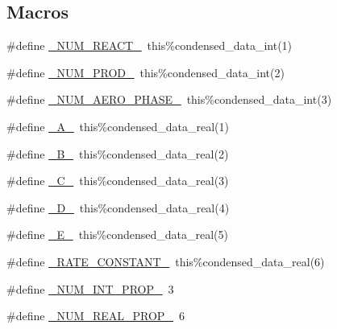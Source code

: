 \subsection*{Macros}
\begin{DoxyCompactItemize}
\item 
\#define \mbox{\hyperlink{rxn__condensed__phase__arrhenius_8_f90_aee1fee52189b85b8a55162815b7eb2ab}{\+\_\+\+N\+U\+M\+\_\+\+R\+E\+A\+C\+T\+\_\+}}~this\%condensed\+\_\+data\+\_\+int(1)
\item 
\#define \mbox{\hyperlink{rxn__condensed__phase__arrhenius_8_f90_a0ab2d7e00e334b5c52335f26ef6025e8}{\+\_\+\+N\+U\+M\+\_\+\+P\+R\+O\+D\+\_\+}}~this\%condensed\+\_\+data\+\_\+int(2)
\item 
\#define \mbox{\hyperlink{rxn__condensed__phase__arrhenius_8_f90_a420df3d7e04a5101c904c5965cbc9897}{\+\_\+\+N\+U\+M\+\_\+\+A\+E\+R\+O\+\_\+\+P\+H\+A\+S\+E\+\_\+}}~this\%condensed\+\_\+data\+\_\+int(3)
\item 
\#define \mbox{\hyperlink{rxn__condensed__phase__arrhenius_8_f90_a09731b4569901a5008e219da69e920ae}{\+\_\+\+A\+\_\+}}~this\%condensed\+\_\+data\+\_\+real(1)
\item 
\#define \mbox{\hyperlink{rxn__condensed__phase__arrhenius_8_f90_afff934ab60a047d4092d5e8c4a14e48a}{\+\_\+\+B\+\_\+}}~this\%condensed\+\_\+data\+\_\+real(2)
\item 
\#define \mbox{\hyperlink{rxn__condensed__phase__arrhenius_8_f90_ac11ee8334d3e3d1551143b92e219bf44}{\+\_\+\+C\+\_\+}}~this\%condensed\+\_\+data\+\_\+real(3)
\item 
\#define \mbox{\hyperlink{rxn__condensed__phase__arrhenius_8_f90_a0ca47e0287d010875dc56e36c9304eb5}{\+\_\+\+D\+\_\+}}~this\%condensed\+\_\+data\+\_\+real(4)
\item 
\#define \mbox{\hyperlink{rxn__condensed__phase__arrhenius_8_f90_a894cfd8084c23f47ad6f1070839fe40a}{\+\_\+\+E\+\_\+}}~this\%condensed\+\_\+data\+\_\+real(5)
\item 
\#define \mbox{\hyperlink{rxn__condensed__phase__arrhenius_8_f90_a90fa57a01e99ca76df9ef2ac521667ec}{\+\_\+\+R\+A\+T\+E\+\_\+\+C\+O\+N\+S\+T\+A\+N\+T\+\_\+}}~this\%condensed\+\_\+data\+\_\+real(6)
\item 
\#define \mbox{\hyperlink{rxn__condensed__phase__arrhenius_8_f90_a54f7194dc6a244f7eb7a78f88b3362ba}{\+\_\+\+N\+U\+M\+\_\+\+I\+N\+T\+\_\+\+P\+R\+O\+P\+\_\+}}~3
\item 
\#define \mbox{\hyperlink{rxn__condensed__phase__arrhenius_8_f90_a242fac7fe42c0d62936c65735dc023a6}{\+\_\+\+N\+U\+M\+\_\+\+R\+E\+A\+L\+\_\+\+P\+R\+O\+P\+\_\+}}~6

\end{DoxyCompactItemize}

